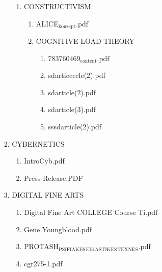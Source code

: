 \documentclass[11pt]{article}
\begin{document}
\begin{enumerate}
\begin{enumerate}
\begin{enumerate}
\begin{enumerate}
\begin{enumerate}
\item CONSTRUCTIVISM
\label{sec-1-1-1-1-7-3-20-4}
\begin{enumerate}
\item ALICE$_{\text{konzept}}$.pdf
\label{sec-1-1-1-1-7-3-20-4-1}

\item COGNITIVE LOAD THEORY
\label{sec-1-1-1-1-7-3-20-4-2}
\begin{enumerate}
\item 783760469$_{\text{content}}$.pdf
\label{sec-1-1-1-1-7-3-20-4-2-1}

\item sdarticcccle(2).pdf
\label{sec-1-1-1-1-7-3-20-4-2-2}

\item sdarticle(2).pdf
\label{sec-1-1-1-1-7-3-20-4-2-3}

\item sdarticle(3).pdf
\label{sec-1-1-1-1-7-3-20-4-2-4}

\item sssdarticle(2).pdf
\label{sec-1-1-1-1-7-3-20-4-2-5}
\end{enumerate}
\end{enumerate}
\end{enumerate}

\item CYBERNETICS
\label{sec-1-1-1-1-7-3-21}
\begin{enumerate}
\item IntroCyb.pdf
\label{sec-1-1-1-1-7-3-21-1}

\item Press Release.PDF
\label{sec-1-1-1-1-7-3-21-2}
\end{enumerate}

\item DIGITAL FINE ARTS
\label{sec-1-1-1-1-7-3-22}
\begin{enumerate}
\item Digital Fine Art   COLLEGE   Course Ti.pdf
\label{sec-1-1-1-1-7-3-22-1}

\item Gene Youngblood.pdf
\label{sec-1-1-1-1-7-3-22-2}

\item PROTASH$_{\text{PSIFIAKES}}$$_{\text{EIKASTIKES}}$$_{\text{TEXNES}}$.pdf
\label{sec-1-1-1-1-7-3-22-3}

\item cgr275-1.pdf
\label{sec-1-1-1-1-7-3-22-4}
\end{enumerate}


\end{enumerate}
\end{enumerate}
\end{enumerate}
\end{enumerate}
\end{document}
